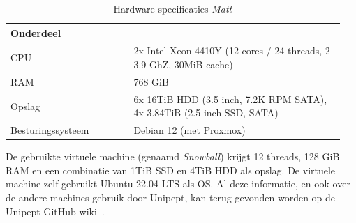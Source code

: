 \documentclass[11pt,dutch,faculty=we,layout=titlefont,underline=false,titleUppercase=true,titleUnderline=true]{ugent2016-report}
\begin{document}
    \begin{table}[h!]
        \centering
        \begin{tabular}{p{0.35\linewidth} p{0.6\linewidth}}
            Onderdeel         &                                                                           \\
            \hline\hline
            CPU               & 2x Intel Xeon 4410Y (12 cores / 24 threads, 2-3.9 GhZ, 30MiB cache)       \\
            RAM               & 768 GiB                                                                   \\
            Opslag            & 6x 16TiB HDD (3.5 inch, 7.2K RPM SATA), 4x 3.84TiB (2.5 inch SSD, SATA) \\
            Besturingssysteem & Debian 12 (met Proxmox)                                                   \\
            \hline
        \end{tabular}
        \caption{Hardware specificaties \textit{Matt}}
        \label{tab:Matt_hardware}
    \end{table}

    De gebruikte virtuele machine (genaamd \textit{Snowball}) krijgt 12 threads, 128 GiB RAM en een combinatie van 1TiB SSD en 4TiB HDD als opslag.
    De virtuele machine zelf gebruikt Ubuntu 22.04 LTS als OS\@.
    Al deze informatie, en ook over de andere machines gebruik door Unipept, kan terug gevonden worden op de Unipept GitHub wiki~\cite{unipept_infrastructure}.

    


    \printbibliography[heading=bibintoc,title={Referenties}] %


    \appendix
    
\end{document}
